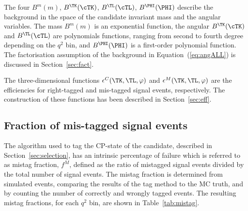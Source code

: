 The four \pdfs $B^m(m)$, $B^{\TK}(\cTK)$, $B^{\TL}(\cTL)$, $B^{\PHI}(\PHI)$ describe the background in the space of the \PBz candidate invariant mass and the angular variables.
The mass \pdf $B^m(m)$ is an exponential function, the angular \pdfs $B^{\TK}(\cTK)$ and $B^{\TL}(\cTL)$ are polynomials functions, ranging from second to fourth degree depending on the $q^2$ bin, and $B^{\PHI}(\PHI)$ is a first-order polynomial function.
The factorisation assumption of the background \pdf in Equation~(\ref{eq:angALL}) is discussed in Section~\ref{sec:fact}.

The three-dimensional functions $\epsilon^{C}(\TK,\TL,\varphi)$ and $\epsilon^{M}(\TK,\TL,\varphi)$ are the efficiencies for right-tagged and mis-tagged signal events, respectively.
The construction of these functions has been described in Section~\ref{sec:eff}.

\subsection{Fraction of mis-tagged signal events}
\label{sec:mistag}


The algorithm used to tag the CP-state of the \PBz candidate, described in Section~\ref{sec:selection}, has an intrinsic percentage of failure which is referred to as mistag fraction, $f^M$, defined as the ratio of mistagged signal events divided by the total number of signal events.
The mistag fraction is determined from simulated events, comparing the results of the tag method to the MC truth, and by counting the number of correctly and wrongly tagged events.
The resulting mistag fractions, for each $q^2$ bin, are shown in Table~\ref{tab:mistag}.

